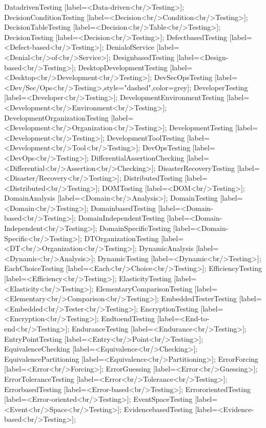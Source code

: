 \documentclass{article}
\begin{document}
{DatadrivenTesting [label=<Data-driven<br/>Testing>];
DecisionConditionTesting [label=<Decision<br/>Condition<br/>Testing>];
DecisionTableTesting [label=<Decision<br/>Table<br/>Testing>];
DecisionTesting [label=<Decision<br/>Testing>];
DefectbasedTesting [label=<Defect-based<br/>Testing>];
DenialofService [label=<Denial<br/>of<br/>Service>];
DesignbasedTesting [label=<Design-based<br/>Testing>];
DesktopDevelopmentTesting [label=<Desktop<br/>Development<br/>Testing>];
DevSecOpsTesting [label=<Dev/Sec/Ops<br/>Testing>,style="dashed",color=grey];
DeveloperTesting [label=<Developer<br/>Testing>];
DevelopmentEnvironmentTesting [label=<Development<br/>Environment<br/>Testing>];
DevelopmentOrganizationTesting [label=<Development<br/>Organization<br/>Testing>];
DevelopmentTesting [label=<Development<br/>Testing>];
DevelopmentToolTesting [label=<Development<br/>Tool<br/>Testing>];
DevOpsTesting [label=<DevOps<br/>Testing>];
DifferentialAssertionChecking [label=<Differential<br/>Assertion<br/>Checking>];
DisasterRecoveryTesting [label=<Disaster/Recovery<br/>Testing>];
DistributedTesting [label=<Distributed<br/>Testing>];
DOMTesting [label=<DOM<br/>Testing>];
DomainAnalysis [label=<Domain<br/>Analysis>];
DomainTesting [label=<Domain<br/>Testing>];
DomainbasedTesting [label=<Domain-based<br/>Testing>];
DomainIndependentTesting [label=<Domain-Independent<br/>Testing>];
DomainSpecificTesting [label=<Domain-Specific<br/>Testing>];
DTOrganizationTesting [label=<DT<br/>Organization<br/>Testing>];
DynamicAnalysis [label=<Dynamic<br/>Analysis>];
DynamicTesting [label=<Dynamic<br/>Testing>];
EachChoiceTesting [label=<Each<br/>Choice<br/>Testing>];
EfficiencyTesting [label=<Efficiency<br/>Testing>];
ElasticityTesting [label=<Elasticity<br/>Testing>];
ElementaryComparisonTesting [label=<Elementary<br/>Comparison<br/>Testing>];
EmbeddedTesterTesting [label=<Embedded<br/>Tester<br/>Testing>];
EncryptionTesting [label=<Encryption<br/>Testing>];
EndtoendTesting [label=<End-to-end<br/>Testing>];
EnduranceTesting [label=<Endurance<br/>Testing>];
EntryPointTesting [label=<Entry<br/>Point<br/>Testing>];
EquivalenceChecking [label=<Equivalence<br/>Checking>];
EquivalencePartitioning [label=<Equivalence<br/>Partitioning>];
ErrorForcing [label=<Error<br/>Forcing>];
ErrorGuessing [label=<Error<br/>Guessing>];
ErrorToleranceTesting [label=<Error<br/>Tolerance<br/>Testing>];
ErrorbasedTesting [label=<Error-based<br/>Testing>];
ErrororientedTesting [label=<Error-oriented<br/>Testing>];
EventSpaceTesting [label=<Event<br/>Space<br/>Testing>];
EvidencebasedTesting [label=<Evidence-based<br/>Testing>];
}
\end{document}
